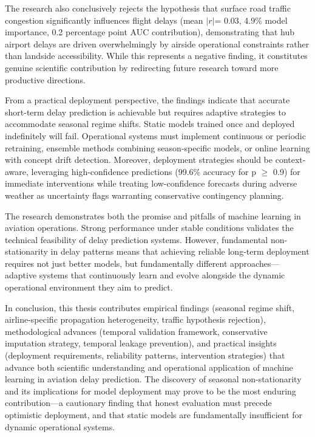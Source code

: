 \documentclass{report}
\begin{document}
The research also conclusively rejects the hypothesis that surface road traffic congestion significantly influences flight delays (mean $|r|$= 0.03, 4.9\% model importance, 0.2 percentage point AUC contribution), demonstrating that hub airport delays are driven overwhelmingly by airside operational constraints rather than landside accessibility. While this represents a negative finding, it constitutes genuine scientific contribution by redirecting future research toward more productive directions.

From a practical deployment perspective, the findings indicate that accurate short-term delay prediction is achievable but requires adaptive strategies to accommodate seasonal regime shifts. Static models trained once and deployed indefinitely will fail. Operational systems must implement continuous or periodic retraining, ensemble methods combining season-specific models, or online learning with concept drift detection. Moreover, deployment strategies should be context-aware, leveraging high-confidence predictions (99.6\% accuracy for p $\geq$ 0.9) for immediate interventions while treating low-confidence forecasts during adverse weather as uncertainty flags warranting conservative contingency planning.

The research demonstrates both the promise and pitfalls of machine learning in aviation operations. Strong performance under stable conditions validates the technical feasibility of delay prediction systems. However, fundamental non-stationarity in delay patterns means that achieving reliable long-term deployment requires not just better models, but fundamentally different approaches—adaptive systems that continuously learn and evolve alongside the dynamic operational environment they aim to predict.

In conclusion, this thesis contributes empirical findings (seasonal regime shift, airline-specific propagation heterogeneity, traffic hypothesis rejection), methodological advances (temporal validation framework, conservative imputation strategy, temporal leakage prevention), and practical insights (deployment requirements, reliability patterns, intervention strategies) that advance both scientific understanding and operational application of machine learning in aviation delay prediction. The discovery of seasonal non-stationarity and its implications for model deployment may prove to be the most enduring contribution—a cautionary finding that honest evaluation must precede optimistic deployment, and that static models are fundamentally insufficient for dynamic operational systems.
\end{document}
